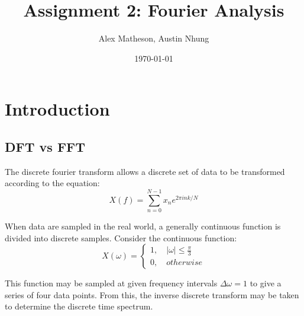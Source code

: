 \message{ !name(Assn2.tex)}\documentclass[twocolumn]{article}
\begin{document}

\title{Assignment 2: Fourier Analysis}
\author{Alex Matheson, Austin Nhung}
\date{\today}
\maketitle

\section{Introduction}
\subsection{DFT vs FFT}
The discrete fourier transform allows a discrete set of data to be transformed according to the equation:
\begin{equation}
X(f) = \sum_{n=0}^{N-1} x_n e^{2\pi ink/N}
\end{equation}

When data are sampled in the real world, a generally continuous function is divided into discrete samples. Consider the continuous function:
\begin{equation}
X(\omega) = \begin{cases}
1, \quad |\omega| \leq \frac{\pi}{3} \\
0, \quad otherwise
\end{cases}
\end{equation}

This function may be sampled at given frequency intervals $\Delta \omega = 1$ to give a series of four data points. From this, the inverse discrete transform may be taken to determine the discrete time spectrum. 
\end{document}
